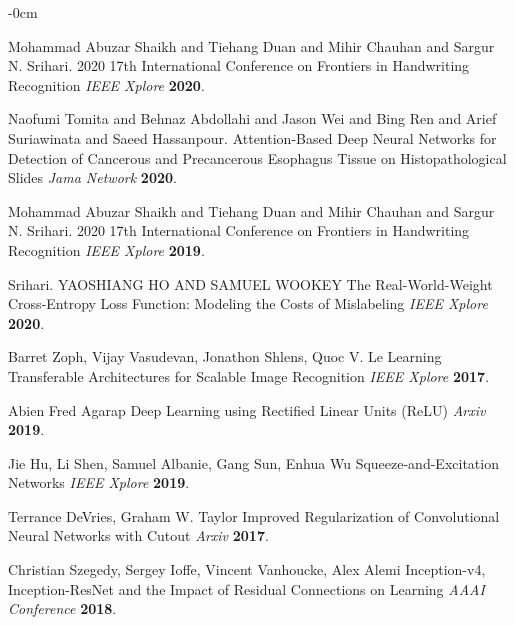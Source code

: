 \documentclass[sensors,article,submit,pdftex,moreauthors]{Definitions/mdpi}
\begin{document}
\begin{adjustwidth}{-\extralength}{0cm}
\begin{thebibliography}{999}
Mohammad Abuzar Shaikh and Tiehang Duan and Mihir Chauhan and Sargur N. Srihari. 2020 17th International Conference on Frontiers in Handwriting Recognition
{\em IEEE Xplore} 
{\bf 2020}.

Naofumi Tomita and Behnaz Abdollahi and Jason Wei and Bing Ren and Arief Suriawinata and Saeed Hassanpour. Attention-Based Deep Neural Networks for Detection of Cancerous and Precancerous Esophagus Tissue on Histopathological Slides
{\em Jama Network} 
{\bf 2020}.

Mohammad Abuzar Shaikh and Tiehang Duan and Mihir Chauhan and Sargur N. Srihari. 2020 17th International Conference on Frontiers in Handwriting Recognition
{\em IEEE Xplore} 
{\bf 2019}.

Srihari. YAOSHIANG HO AND SAMUEL WOOKEY The Real-World-Weight Cross-Entropy Loss Function: Modeling the Costs of Mislabeling 
{\em IEEE Xplore} 
{\bf 2020}.

Barret Zoph, Vijay Vasudevan, Jonathon Shlens, Quoc V. Le Learning Transferable Architectures for Scalable Image Recognition 
{\em IEEE Xplore} 
{\bf 2017}.

Abien Fred Agarap Deep Learning using Rectified Linear Units (ReLU) 
{\em Arxiv} 
{\bf 2019}.

Jie Hu, Li Shen, Samuel Albanie, Gang Sun, Enhua Wu Squeeze-and-Excitation Networks 
{\em IEEE Xplore} 
{\bf 2019}.

Terrance DeVries, Graham W. Taylor Improved Regularization of Convolutional Neural Networks with Cutout 
{\em Arxiv} 
{\bf 2017}.

Christian Szegedy, Sergey Ioffe, Vincent Vanhoucke, Alex Alemi Inception-v4, Inception-ResNet and the Impact of Residual Connections on Learning
{\em AAAI Conference} 
{\bf 2018}.

\end{thebibliography}

%


\end{adjustwidth}
\end{document}
